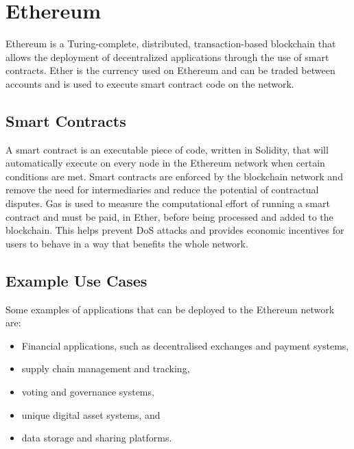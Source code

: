 
\section{Ethereum}

Ethereum is a Turing-complete, distributed, transaction-based blockchain that allows the deployment of decentralized applications through the use of smart contracts. Ether is the currency used on Ethereum and can be traded between accounts and is used to execute smart contract code on the network. 

\subsection*{Smart Contracts}

A smart contract is an executable piece of code, written in Solidity, that will automatically execute on every node in the Ethereum network when certain conditions are met. Smart contracts are enforced by the blockchain network and remove the need for intermediaries and reduce the potential of contractual disputes.
\x
Gas is used to measure the computational effort of running a smart contract and must be paid, in Ether, before being processed and added to the blockchain. This helps prevent DoS attacks and provides economic incentives for users to behave in a way that benefits the whole network.

\subsection*{Example Use Cases}

Some examples of applications that can be deployed to the Ethereum network are:

\begin{itemize}
  \item Financial applications, such as decentralised exchanges and payment systems,
  \item supply chain management and tracking,
  \item voting and governance systems,
  \item unique digital asset systems, and
  \item data storage and sharing platforms.
\end{itemize}